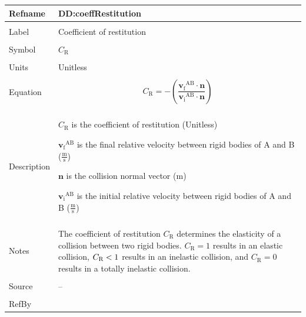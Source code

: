 \documentclass[12pt]{article}
\newcommand{\lt}{\ensuremath <}
\begin{document}
\vspace{\baselineskip}
\noindent
\begin{minipage}{\textwidth}
\begin{tabular}{>{\raggedright}p{}>{\raggedright\arraybackslash}p{}}
\toprule \textbf{Refname} & \textbf{DD:coeffRestitution}
\label{DD:coeffRestitution}
\\ \midrule \\
Label & Coefficient of restitution
        
\\ \midrule \\
Symbol & ${C_{\text{R}}}$
         
\\ \midrule \\
Units & Unitless
        
\\ \midrule \\
Equation & \begin{displaymath}
           {C_{\text{R}}}=-\left(\frac{{{\mathbf{v}_{\text{f}}}^{\text{A}\text{B}}}\cdot{}\mathbf{n}}{{{\mathbf{v}_{\text{i}}}^{\text{A}\text{B}}}\cdot{}\mathbf{n}}\right)
           \end{displaymath}
\\ \midrule \\
Description & \begin{symbDescription}
              \item{${C_{\text{R}}}$ is the coefficient of restitution (Unitless)}
              \item{${{\mathbf{v}_{\text{f}}}^{\text{A}\text{B}}}$ is the final relative velocity between rigid bodies of A and B ($\frac{\text{m}}{\text{s}}$)}
              \item{$\mathbf{n}$ is the collision normal vector (${\text{m}}$)}
              \item{${{\mathbf{v}_{\text{i}}}^{\text{A}\text{B}}}$ is the initial relative velocity between rigid bodies of A and B ($\frac{\text{m}}{\text{s}}$)}
              \end{symbDescription}
\\ \midrule \\
Notes & The coefficient of restitution ${C_{\text{R}}}$ determines the elasticity of a collision between two rigid bodies. ${C_{\text{R}}}=1$ results in an elastic collision, ${C_{\text{R}}}\lt{}1$ results in an inelastic collision, and ${C_{\text{R}}}=0$ results in a totally inelastic collision.
        
\\ \midrule \\
Source & --
         
\\ \midrule \\
RefBy & 
\\ \bottomrule
\end{tabular}
\end{minipage}
\end{document}
